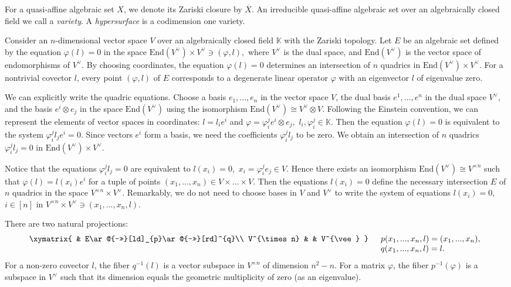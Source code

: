 \documentclass[11pt]{article}
\theoremstyle{plain}
\theoremstyle{definition}
\theoremstyle{remark}
\theoremstyle{plain}
\theoremstyle{plain}
\theoremstyle{plain}
\theoremstyle{definition}
\begin{document}
For a quasi-affine algebraic set $X$, we denote its Zariski closure
by $\overline{X}$. An irreducible quasi-affine algebraic set over
an algebraically closed field we call a \textit{variety}. A \textit{hypersurface}
is a codimension one variety.

Consider an $n$-dimensional vector space $V$ over an algebraically
closed field $\mathbb{K}$ with the Zariski topology. Let $E$ be
an algebraic set defined by the equation $\varphi(l)=0$ in the space
$\mathrm{End}(V^{\lor})\times V^{\lor}\ni(\varphi,l),$ where $V^{\lor}$
is the dual space, and $\mathrm{End}(V^{\lor})$ is the vector space
of endomorphisms of $V^{\vee}$. By choosing coordinates, the equation
$\varphi(l)=0$ determines an intersection of $n$ quadrics in $\mathrm{End}(V^{\lor})\times V^{\lor}$.
For a nontrivial covector $l$, every point $(\varphi,l)$ of $E$
corresponds to a degenerate linear operator $\varphi$ with an eigenvector
$l$ of eigenvalue zero. 

We can explicitly write the quadric equations. Choose a basis $e_{1},...,e_{n}$
in the vector space $V$, the dual basis $e^{1},...,e^{n}$ in the
dual space $V^{\vee}$, and the basis $e^{i}\otimes e_{j}$ in the
space $\mathrm{End}(V^{\lor})$ using the isomorphism $\mathrm{End}(V^{\lor})\cong V^{\lor}\otimes V$.
Following the Einstein convention, we can represent the elements of
vector spaces in coordinates: $l=l_{i}e^{i}$ and $\varphi=\varphi_{i}^{j}e^{i}\otimes e_{j},$
$l_{i},\varphi_{i}^{j}\in\mathbb{K}$. Then the equation $\varphi(l)=0$
is equivalent to the system $\varphi_{i}^{j}l_{j}e^{i}=0.$ Since
vectors $e^{i}$ form a basis, we need the coefficients $\varphi_{i}^{j}l_{j}$
to be zero. We obtain an intersection of $n$ quadrics $\varphi_{i}^{j}l_{j}=0$
in $\mathrm{End}(V^{\lor})\times V^{\lor}$.

Notice that the equations $\varphi_{i}^{j}l_{j}=0$ are equivalent
to $l(x_{i})=0,$ $x_{i}=\varphi_{i}^{j}e_{j}\in V$. Hence there
exists an isomorphism $\mathrm{End}(V^{\lor})\cong V^{\times n}$
such that $\varphi(l)=l(x_{i})e^{i}$ for a tuple of points $(x_{1},...,x_{n})\in V\times...\times V$.
Then the equations $l(x_{i})=0$ define the necessary intersection
$E$ of $n$ quadrics in the space $V^{\times n}\times V^{\vee}.$
Remarkably, we do not need to choose bases in $V$ and $V^{\vee}$
to write the system of equations $l(x_{i})=0,$ $i\in[n]$ in $V^{\times n}\times V^{\vee}\ni(x_{1},...,x_{n},l).$

There are two natural projections: 
\[
\begin{array}[t]{cc}
\xymatrix{ & E\ar@{->>}[ld]_{p}\ar@{->>}[rd]^{q}\\
V^{\times n} &  & V^{\vee}
}
 & \begin{array}[t]{l}
p(x_{1},...,x_{n},l)=(x_{1},...,x_{n}),\\
q(x_{1},...,x_{n},l)=l.
\end{array}\end{array}
\]
For a non-zero covector $l$, the fiber $q^{-1}(l)$ is a vector subspace
in $V^{\times n}$ of dimension $n^{2}-n$. For a matrix $\varphi$,
the fiber $p^{-1}(\varphi)$ is a subspace in $V^{\lor}$ such that
its dimension equals the geometric multiplicity of zero (as an eigenvalue).
\end{document}
